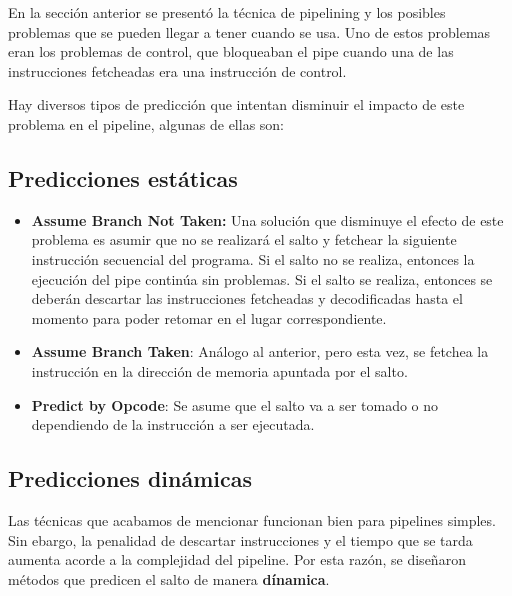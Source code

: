 En la sección anterior se presentó la técnica de pipelining y los posibles problemas que se pueden llegar a tener cuando se usa. Uno de estos problemas eran los problemas de control, que bloqueaban el pipe cuando una de las instrucciones fetcheadas era una instrucción de control.

Hay diversos tipos de predicción que intentan disminuir el impacto de este problema en el pipeline, algunas de ellas son:

\subsection{Predicciones estáticas}
\begin{itemize}
	\item \textbf{Assume Branch Not Taken:} Una solución que disminuye el efecto de este problema es asumir que no se realizará el salto y fetchear la siguiente instrucción secuencial del programa. Si el salto no se realiza, entonces la ejecución del pipe continúa sin problemas. Si el salto se realiza, entonces se deberán descartar las instrucciones fetcheadas y decodificadas hasta el momento para poder retomar en el lugar correspondiente.
	\item \textbf{Assume Branch Taken}: Análogo al anterior, pero esta vez, se fetchea la instrucción en la dirección de memoria apuntada por el salto.
	\item \textbf{Predict by Opcode}: Se asume que el salto va a ser tomado o no dependiendo de la instrucción a ser ejecutada.
\end{itemize}

\subsection{Predicciones dinámicas}
Las técnicas que acabamos de mencionar funcionan bien para pipelines simples. Sin ebargo, la penalidad de descartar instrucciones y el tiempo que se tarda aumenta acorde a la complejidad del pipeline. Por esta razón, se diseñaron métodos que predicen el salto de manera \textbf{dínamica}.

